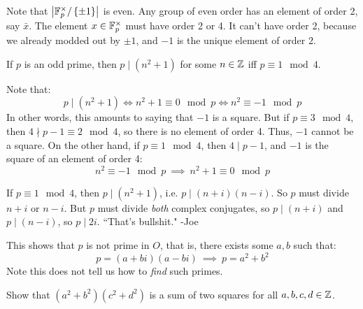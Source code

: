 \begin{pf}[source=Primary Source Material]
    Note that $ \abs{\mathbb{F}_{p}^{\times}/\left\{{\pm1}\right\}} $ is even. \vsp
    Any group of even order has an element of order 2, say $ \bar{x} $.
    The element $ x \in \mathbb{F}_{p}^{\times} $ must have order 2 or 4. \vsp
    It can't have order 2, because we already modded out by $ \pm 1 $, and $ -1 $ is the unique
    element of order 2.
\end{pf}

\begin{lm}
    If $ p $ is an odd prime, then $ p \mid (n^{2} + 1) $ for some $ n \in \mathbb{Z} $ iff
    $ p \equiv 1 \mod 4 $.
\end{lm}

\begin{pf}[source=Primary Source Material]
    Note that:
    \begin{equation*}
        p \mid (n^{2} + 1) \iff n^{2}+1 \equiv 0 \mod p \iff n^{2} \equiv -1 \mod p
    \end{equation*}
    In other words, this amounts to saying that $ -1 $ is a square.
    But if $ p \equiv 3 \mod 4 $, then $ 4 \nmid p-1 \equiv 2 \mod 4 $, so there is no element
    of order 4. Thus, $ -1 $ cannot be a square. \vsp
    On the other hand, if $ p \equiv 1 \mod 4 $, then $ 4 \mid p-1 $, and $ -1 $ is the square of
    an element of order 4:
    \begin{equation*}
        n^{2} \equiv -1 \mod p \ \implies \ n^{2} + 1 \equiv 0 \mod p
    \end{equation*}
\end{pf}

If $ p \equiv 1 \mod 4 $, then $ p \mid (n^{2}+1) $, i.e. $ p \mid (n+i)(n-i) $.
So $ p $ must divide $ n+i $ or $ n-i $. But $ p $ must divide \textit{both} complex conjugates,
so $ p \mid (n+i) $ and $ p\mid(n-i) $, so $ p \mid 2i $. ``That's bullshit." -Joe

This shows that $ p $ is not prime in $ O $, that is, there exists some $ a,b $ such that:
\begin{equation*}
    p = (a+bi)(a-bi) \ \implies \ p=a^{2}+b^{2}
\end{equation*}
Note this does not tell us how to \textit{find} such primes.
\begin{exr}[source=Primary Source Material]
    Show that $ (a^{2}+b^{2})(c^{2}+d^{2}) $ is a sum of two squares for all $ a,b,c,d \in \mathbb{Z} $.
\end{exr}

